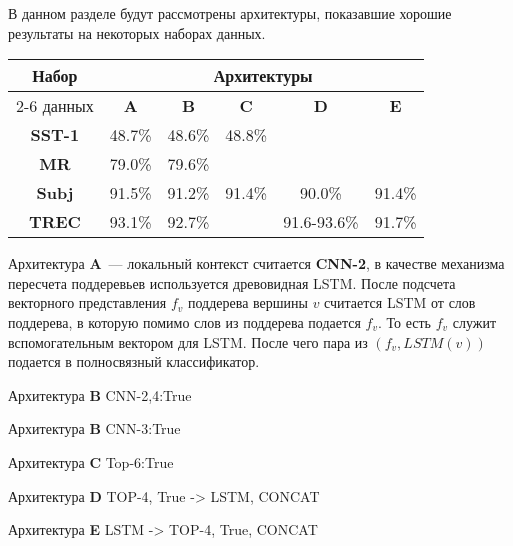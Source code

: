 В данном разделе будут рассмотрены архитектуры, показавшие хорошие результаты на некоторых наборах данных.

\vspace{5mm}
\noindent \begin{minipage}{\linewidth}
 \label{tab:title} 
\begin{tabular}{|c|c|c|c|c|c|}
\hline
\multirow{2}{*}{Набор}   &             \multicolumn{5}{c|}{Архитектуры} \\ \cline{2-6} 
     данных              &  \textbf{A}  & \textbf{B} & \textbf{C} & \textbf{D} & \textbf{E} \\ \hline
\textbf{SST-1}           & 48.7\%       & 48.6\%     & 48.8\%     &            &            \\ \hline
\textbf{MR}              & 79.0\%       & 79.6\%     &            &            &            \\ \hline
\textbf{Subj}            & 91.5\%       & 91.2\%     & 91.4\%     & 90.0\%     & 91.4\%     \\ \hline
\textbf{TREC}            & 93.1\%       & 92.7\%     &            & 91.6-93.6\%& 91.7\%           \\ \hline
\end{tabular}
\end{minipage}
\vspace{5mm}

Архитектура \textbf{A}~--- локальный контекст считается \textbf{CNN-2}, в качестве механизма пересчета поддеревьев используется древовидная LSTM. После подсчета векторного представления $f_v$ поддерева вершины $v$ считается LSTM от слов поддерева, в которую помимо слов из поддерева подается $f_v$. То есть $f_v$ служит вспомогательным вектором для
LSTM. После чего пара из $(f_v, LSTM(v))$ подается в полносвязный классификатор.

Архитектура \textbf{B} CNN-2,4:True

Архитектура \textbf{B} CNN-3:True

Архитектура \textbf{C} Top-6:True

Архитектура \textbf{D} TOP-4, True -> LSTM, CONCAT

Архитектура \textbf{E} LSTM -> TOP-4, True, CONCAT